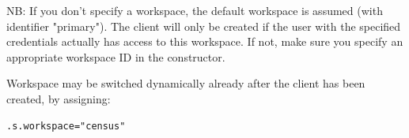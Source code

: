 NB: If you don't specify a workspace, the default workspace is assumed (with identifier "primary"). The client will only be created if the user with the specified credentials actually has access to this workspace. If not, make sure you specify an appropriate workspace ID in the constructor.

Workspace may be switched dynamically already after the client has been created, by assigning:
\begin{lstlisting}
.s.workspace="census"
\end{lstlisting}
